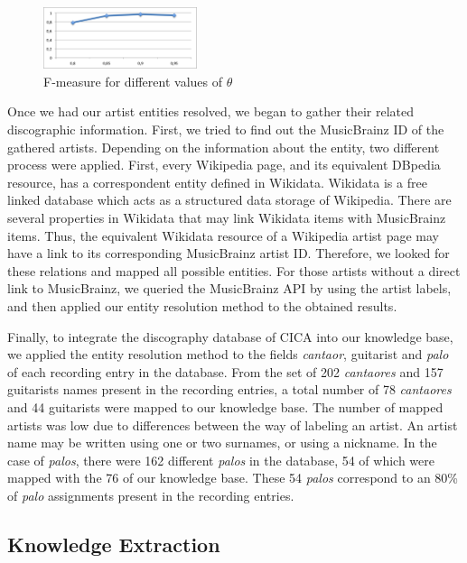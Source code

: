 \begin{figure}
	\centering
	\includegraphics[width=0.40\textwidth]{ch05_musicology/pics/similarity_f.png}
	\caption{F-measure for different values of $\theta$ \label{fig:musicology:fmeasure}}
\end{figure}

Once we had our artist entities resolved, we began to gather their related discographic information. First, we tried to find out the MusicBrainz ID of the gathered artists. Depending on the information about the entity, two different process were applied. First, every Wikipedia page, and its equivalent DBpedia resource, has a correspondent entity defined in Wikidata. Wikidata is a free linked database which acts as a structured data storage of Wikipedia. There are several properties in Wikidata that may link Wikidata items with MusicBrainz items. Thus, the equivalent Wikidata resource of a Wikipedia artist page may have a link to its corresponding MusicBrainz artist ID. Therefore, we looked for these relations and mapped all possible entities. For those artists without a direct link to MusicBrainz, we queried the MusicBrainz API by using the artist labels, and then applied our entity resolution method to the obtained results.

Finally, to integrate the discography database of CICA into our knowledge base, we applied the entity resolution method to the fields \textit{cantaor}, guitarist and \textit{palo} of each recording entry in the database. From the set of 202 \textit{cantaores} and 157 guitarists names present in the recording entries, a total number of 78 \textit{cantaores} and 44 guitarists were mapped to our knowledge base. The number of mapped artists was low due to differences between the way of labeling an artist. An artist name may be written using one or two surnames, or using a nickname. In the case of \textit{palos}, there were 162 different \textit{palos} in the database, 54 of which were mapped with the 76 of our knowledge base. These 54 \textit{palos} correspond to an 80\% of \textit{palo} assignments present in the recording entries.


\subsection{Knowledge Extraction}\label{sec:musicology:kb_extraction}

